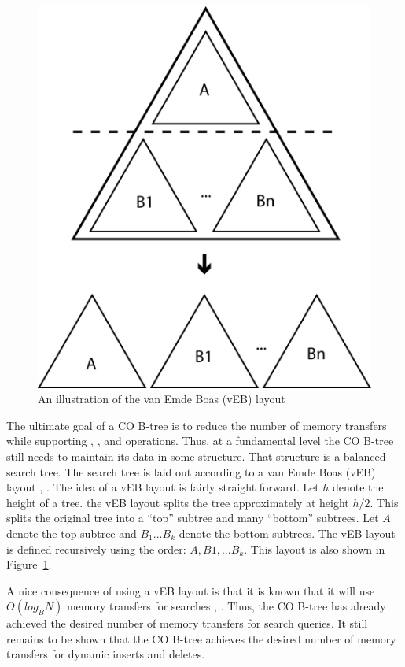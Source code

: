 \documentclass{style}
\begin{document}
\begin{figure}

\begin{center}
	\includegraphics[width=0.8\columnwidth]{figures/veb.pdf}
\end{center}

\caption{An illustration of the van Emde Boas (vEB) layout}
\label{fig:veb}
\end{figure}


The ultimate goal of a CO B-tree is to reduce the number of memory transfers
while supporting \Search{}, \Insert{}, and \Delete{} operations. Thus, at a
fundamental level the CO B-tree still needs to maintain its data in some
structure. That structure is a balanced search tree. The search tree is laid
out according to a van Emde Boas (vEB) layout \cite{veb1}, \cite{veb2}. The
idea of a vEB layout is fairly straight forward. Let $h$ denote the height of
a tree. the vEB layout splits the tree approximately at height $h/2$. This
splits the original tree into a ``top'' subtree and many ``bottom'' subtrees.
Let $A$ denote the top subtree and $B_1... B_k$ denote the bottom subtrees.
The vEB layout is defined recursively using the order: $A, B1, ... B_k$. This
layout is also shown in Figure~\ref{fig:veb}.

A nice consequence of using a vEB layout is that it is known that it will use
$O(log_B N)$ memory transfers for searches \cite{veb1}, \cite{veb2}. Thus, the
CO B-tree has already achieved the desired number of memory transfers for
search queries. It still remains to be shown that the CO B-tree achieves the
desired number of memory transfers for dynamic inserts and deletes.
\end{document}
